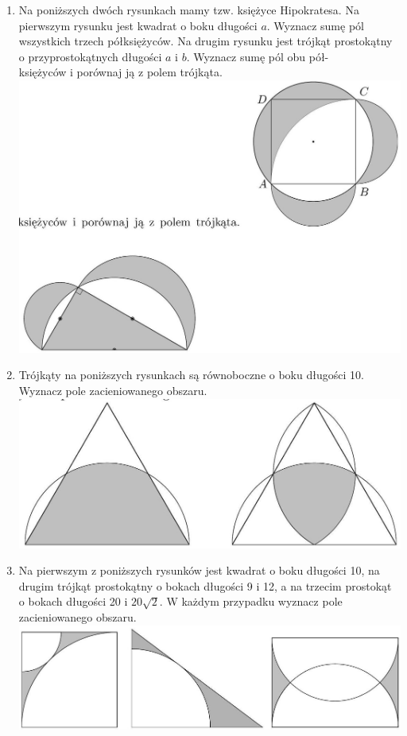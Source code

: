 \documentclass[10pt]{article}
\begin{document}
\begin{enumerate}
  \item Na poniższych dwóch rysunkach mamy tzw. księżyce Hipokratesa. Na pierwszym rysunku jest kwadrat o boku długości \(a\). Wyznacz sumę pól wszystkich trzech półksiężyców. Na drugim rysunku jest trójkąt prostokątny o przyprostokątnych długości \(a\) i \(b\). Wyznacz sumę pól obu pół-\\
księżyców i porównaj ją z polem trójkąta.\\
\includegraphics[max width=\textwidth, center]{2024_11_21_e9b4faa005d5be2cc318g-064(1)}
  \item Trójkąty na poniższych rysunkach są równoboczne o boku długości 10. Wyznacz pole zacieniowanego obszaru.\\
\includegraphics[max width=\textwidth, center]{2024_11_21_e9b4faa005d5be2cc318g-064}
  \item Na pierwszym z poniższych rysunków jest kwadrat o boku długości 10, na drugim trójkąt prostokątny o bokach długości 9 i 12, a na trzecim prostokąt o bokach długości 20 i \(20 \sqrt{2}\). W każdym przypadku wyznacz pole zacieniowanego obszaru.\\
\includegraphics[max width=\textwidth, center]{2024_11_21_e9b4faa005d5be2cc318g-065(1)}

\end{enumerate}
\end{document}
